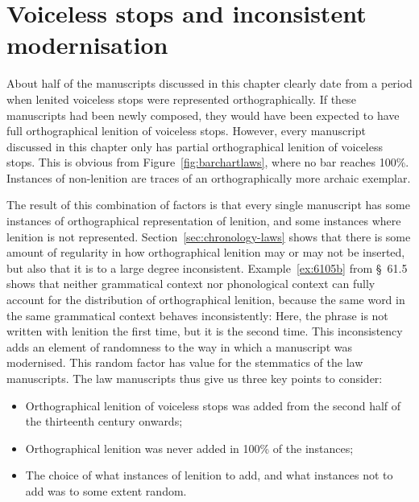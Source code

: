 

\section{Voiceless stops and inconsistent modernisation}
\label{sec:voiceless-stops}
About half of the manuscripts discussed in this chapter clearly date from a period when lenited voiceless stops were represented orthographically. If these manuscripts had been newly composed, they would have been expected to  have full orthographical lenition of voiceless stops. However, every manuscript discussed in this chapter only has partial orthographical lenition of voiceless stops. This is obvious from Figure~\ref{fig:barchartlaws}, where no bar reaches 100\%. Instances of non-lenition are traces of an orthographically more archaic exemplar.

The result of this combination of factors is that every single  manuscript has some instances of orthographical representation of lenition, and some instances where lenition is not represented. Section~\ref{sec:chronology-laws} shows that there is some amount of regularity in how orthographical lenition may or may not be inserted, but also that it is to a large degree inconsistent. Example~\ref{ex:6105b} from §~61.5 shows that neither grammatical context nor phonological context can fully account for the distribution of orthographical lenition, because the same word in the same grammatical context behaves inconsistently:
Here, the phrase  is not written with lenition the first time, but it is the second time. This inconsistency adds an element of randomness to the way in which a manuscript was modernised. This random factor has value for the stemmatics of the law manuscripts. The law manuscripts thus give us three key points to consider:
\begin{itemize}
\item Orthographical lenition of voiceless stops was added from the second half of the thirteenth century onwards;
\item Orthographical lenition was never added in 100\% of the instances;
\item The choice of what instances of lenition to add, and what instances not to add was to some extent random.
\end{itemize}

